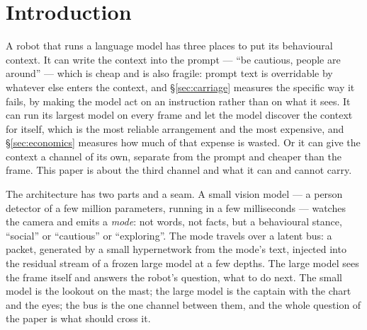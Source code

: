 \documentclass[11pt]{article}
\begin{document}
\section{Introduction}\label{sec:intro}

A robot that runs a language model has three places to put its
behavioural context. It can write the context into the prompt --- ``be
cautious, people are around'' --- which is cheap and is also fragile:
prompt text is overridable by whatever else enters the context, and
\S\ref{sec:carriage} measures the specific way it fails, by making the
model act on an instruction rather than on what it sees. It can run its
largest model on every frame and let the model discover the context for
itself, which is the most reliable arrangement and the most expensive,
and \S\ref{sec:economics} measures how much of that expense is wasted.
Or it can give the context a channel of its own, separate from the
prompt and cheaper than the frame. This paper is about the third
channel and what it can and cannot carry.

The architecture has two parts and a seam. A small vision model --- a
person detector of a few million parameters, running in a few
milliseconds --- watches the camera and emits a \emph{mode}: not words,
not facts, but a behavioural stance, ``social'' or ``cautious'' or
``exploring''. The mode travels over a latent bus: a packet, generated
by a small hypernetwork from the mode's text, injected into the residual
stream of a frozen large model at a few depths. The large model sees the
frame itself and answers the robot's question, what to do next. The
small model is the lookout on the mast; the large model is the captain
with the chart and the eyes; the bus is the one channel between them,
and the whole question of the paper is what should cross it.
\end{document}
